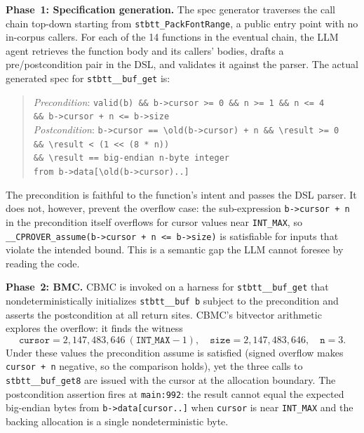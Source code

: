 \documentclass[11pt,a4paper]{article}
\begin{document}
\smallskip\noindent\textbf{Phase~1: Specification generation.}
The spec generator traverses the call chain top-down starting from
\texttt{stbtt\_PackFontRange}, a public entry point with no in-corpus callers.
For each of the 14 functions in the eventual chain, the LLM agent retrieves
the function body and its callers' bodies, drafts a pre/postcondition pair in
the DSL, and validates it against the parser.  The actual generated spec for
\texttt{stbtt\_\_buf\_get} is:
\begin{quote}\small
\textit{Precondition}:
\texttt{valid(b) \&\& b->cursor >= 0 \&\& n >= 1 \&\& n <= 4}\\
\hspace*{1.8cm}\texttt{\&\& b->cursor + n <= b->size}\\[2pt]
\textit{Postcondition}:
\texttt{b->cursor == {\textbackslash}old(b->cursor) + n \&\& {\textbackslash}result >= 0}\\
\hspace*{1.8cm}\texttt{\&\& {\textbackslash}result < (1 << (8 * n))}\\
\hspace*{1.8cm}\texttt{\&\& {\textbackslash}result == big-endian n-byte integer}\\
\hspace*{1.8cm}\texttt{\phantom{\&\& }from b->data[{\textbackslash}old(b->cursor)..]}
\end{quote}
The precondition is faithful to the function's intent and passes the DSL
parser.  It does not, however, prevent the overflow case: the sub-expression
\texttt{b->cursor + n} in the precondition itself overflows for cursor values
near \texttt{INT\_MAX}, so \texttt{\_\_CPROVER\_assume(b->cursor + n <= b->size)}
is satisfiable for inputs that violate the intended bound.  This is a semantic
gap the LLM cannot foresee by reading the code.

\smallskip\noindent\textbf{Phase~2: BMC.}
CBMC is invoked on a harness for \texttt{stbtt\_\_buf\_get} that
nondeterministically initializes \texttt{stbtt\_\_buf b} subject to the
precondition and asserts the postcondition at all return sites.
CBMC's bitvector arithmetic explores the overflow: it finds the witness
\[
  \texttt{cursor} = 2{,}147{,}483{,}646\ (\mathtt{INT\_MAX}{-}1),\quad
  \texttt{size} = 2{,}147{,}483{,}646,\quad
  \texttt{n} = 3.
\]
Under these values the precondition assume is satisfied (signed overflow
makes \texttt{cursor + n} negative, so the comparison holds), yet the three
calls to \texttt{stbtt\_\_buf\_get8} are issued with the cursor at the
allocation boundary.  The postcondition assertion fires at \texttt{main:992}:
the result cannot equal the expected big-endian bytes from
\texttt{b->data[cursor..]} when \texttt{cursor} is near \texttt{INT\_MAX} and
the backing allocation is a single nondeterministic byte.
\end{document}
